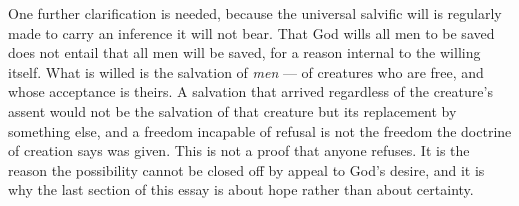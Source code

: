 One further clarification is needed, because the universal salvific will is regularly made to carry an inference it will not bear. That God wills all men to be saved does not entail that all men will be saved, for a reason internal to the willing itself. What is willed is the salvation of \emph{men} --- of creatures who are free, and whose acceptance is theirs. A salvation that arrived regardless of the creature's assent would not be the salvation of that creature but its replacement by something else, and a freedom incapable of refusal is not the freedom the doctrine of creation says was given. This is not a proof that anyone refuses. It is the reason the possibility cannot be closed off by appeal to God's desire, and it is why the last section of this essay is about hope rather than about certainty.
